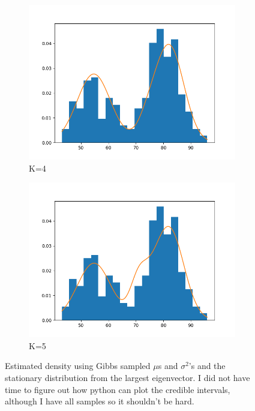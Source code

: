 \begin{figure}
\begin{subfigure}[b]{0.3\textwidth}
         \centering
         \includegraphics[width=\textwidth]{../code/q2/data_hist_k4.png}
         \caption{K=4}
         \label{fig:k=4}
     \end{subfigure}
     \hfill
     \begin{subfigure}[b]{0.3\textwidth}
         \centering
         \includegraphics[width=\textwidth]{../code/q2/data_hist_k5.png}
         \caption{K=5}
         \label{fig:k=5}
     \end{subfigure}
        \caption{Estimated density using Gibbs sampled $\mu$s and $\sigma^2$'s and the stationary distribution from the largest eigenvector.
        I did not have time to figure out how python can plot the credible intervals, although I have all samples so it shouldn't be hard.}
        \label{fig:K_components}
\end{figure}


